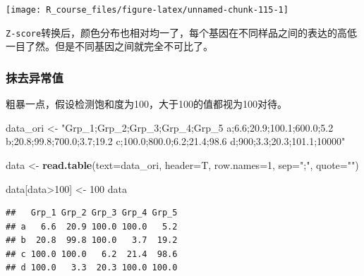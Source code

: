 \documentclass[]{article}
\newenvironment{Shaded}{\begin{snugshade}}{\end{snugshade}}
\newcommand{\KeywordTok}[1]{\textcolor[rgb]{0.13,0.29,0.53}{\textbf{{#1}}}}
\newcommand{\DataTypeTok}[1]{\textcolor[rgb]{0.13,0.29,0.53}{{#1}}}
\newcommand{\DecValTok}[1]{\textcolor[rgb]{0.00,0.00,0.81}{{#1}}}
\newcommand{\StringTok}[1]{\textcolor[rgb]{0.31,0.60,0.02}{{#1}}}
\newcommand{\NormalTok}[1]{{#1}}
\numberwithin{figure}{section}
\numberwithin{table}{section}
\theoremstyle{definition}
\theoremstyle{definition}
\theoremstyle{definition}
\theoremstyle{remark}
\begin{document}
\begin{center}\texttt{[image: R\_course\_files/figure-latex/unnamed-chunk-115-1]} \end{center}

\texttt{Z-score}转换后，颜色分布也相对均一了，每个基因在不同样品之间的表达的高低一目了然。但是不同基因之间就完全不可比了。

\subsubsection{抹去异常值}

粗暴一点，假设检测饱和度为100，大于100的值都视为100对待。

\begin{Shaded}
\begin{Highlighting}[]
\NormalTok{data_ori <-}\StringTok{ "Grp_1;Grp_2;Grp_3;Grp_4;Grp_5}
\StringTok{a;6.6;20.9;100.1;600.0;5.2}
\StringTok{b;20.8;99.8;700.0;3.7;19.2}
\StringTok{c;100.0;800.0;6.2;21.4;98.6}
\StringTok{d;900;3.3;20.3;101.1;10000"}

\NormalTok{data <-}\StringTok{ }\KeywordTok{read.table}\NormalTok{(}\DataTypeTok{text=}\NormalTok{data_ori, }\DataTypeTok{header=}\NormalTok{T, }\DataTypeTok{row.names=}\DecValTok{1}\NormalTok{, }\DataTypeTok{sep=}\StringTok{";"}\NormalTok{, }\DataTypeTok{quote=}\StringTok{""}\NormalTok{)}

\NormalTok{data[data>}\DecValTok{100}\NormalTok{] <-}\StringTok{ }\DecValTok{100}
\NormalTok{data}
\end{Highlighting}
\end{Shaded}

\begin{verbatim}
##   Grp_1 Grp_2 Grp_3 Grp_4 Grp_5
## a   6.6  20.9 100.0 100.0   5.2
## b  20.8  99.8 100.0   3.7  19.2
## c 100.0 100.0   6.2  21.4  98.6
## d 100.0   3.3  20.3 100.0 100.0
\end{verbatim}
\end{document}
